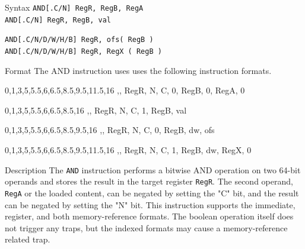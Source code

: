 %
%
\pagebreak
{}

\begin{iPageDescEntry}{Syntax}
  \texttt{AND[.C/N] RegR, RegB, RegA} \\
  \texttt{AND[.C/N] RegR, RegB, val}
  
  \texttt{AND[.C/N/D/W/H/B] RegR, ofs( RegB )} \\
  \texttt{AND[.C/N/D/W/H/B] RegR, RegX ( RegB )}
\end{iPageDescEntry}

\begin{iPageDescEntry}{Format}
  The AND instruction uses uses the following instruction formats. \\
	
  \begin{flushleft}	
  \drawInstrFormat
  	{0,1,3,5,5.5,6,6.5,8.5,9.5,11.5,16}
  	{\OpCodeGrpALU,\OpCodeAND, RegR, N, C, 0, RegB, 0, RegA, 0}
	
  \drawInstrFormat
  	{0,1,3,5,5.5,6,6.5,8.5,16}
  	{\OpCodeGrpALU,\OpCodeAND, RegR, N, C, 1, RegB, val}

  \drawInstrFormat
  	{0,1,3,5,5.5,6,6.5,8.5,9.5,16}
  	{\OpCodeGrpMEM,\OpCodeAND, RegR, N, C, 0, RegB, dw, ofs}
 
  \drawInstrFormat
  	{0,1,3,5,5.5,6,6.5,8.5,9.5,11.5,16}
  	{\OpCodeGrpMEM,\OpCodeAND, RegR, N, C, 1, RegB, dw, RegX, 0}
  \end{flushleft}
\end{iPageDescEntry}

\begin{iPageDescEntry}{Description}
  The \texttt{AND} instruction performs a bitwise AND operation on two 64-bit operands and stores the result in the target register \texttt{RegR}. The second operand, \texttt{RegA} or the loaded content, can be negated by setting the "C" bit, and the result can be negated by setting the "N" bit. This instruction supports the immediate, register, and both memory-reference formats. The boolean operation itself does not trigger any traps, but the indexed formats may cause a memory-reference related trap.
\end{iPageDescEntry}

